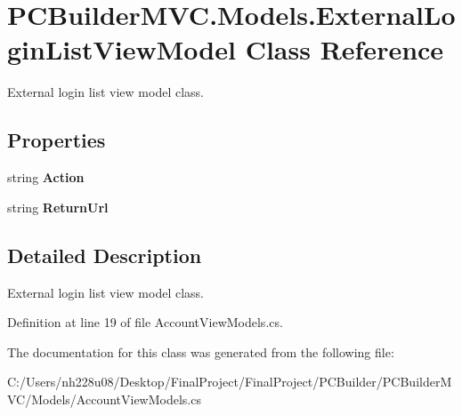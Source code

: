 \hypertarget{class_p_c_builder_m_v_c_1_1_models_1_1_external_login_list_view_model}{}\section{P\+C\+Builder\+M\+V\+C.\+Models.\+External\+Login\+List\+View\+Model Class Reference}
\label{class_p_c_builder_m_v_c_1_1_models_1_1_external_login_list_view_model}


External login list view model class.  


\subsection*{Properties}
\begin{DoxyCompactItemize}
\item 
string {\bfseries Action}\hypertarget{class_p_c_builder_m_v_c_1_1_models_1_1_external_login_list_view_model_a04ad600ba1d7a65605acf6303c2b5189}{}\label{class_p_c_builder_m_v_c_1_1_models_1_1_external_login_list_view_model_a04ad600ba1d7a65605acf6303c2b5189}

\item 
string {\bfseries Return\+Url}\hypertarget{class_p_c_builder_m_v_c_1_1_models_1_1_external_login_list_view_model_ac764151b2b62a55514ffa72879488568}{}\label{class_p_c_builder_m_v_c_1_1_models_1_1_external_login_list_view_model_ac764151b2b62a55514ffa72879488568}

\end{DoxyCompactItemize}


\subsection{Detailed Description}
External login list view model class. 



Definition at line 19 of file Account\+View\+Models.\+cs.



The documentation for this class was generated from the following file\+:\begin{DoxyCompactItemize}
\item 
C\+:/\+Users/nh228u08/\+Desktop/\+Final\+Project/\+Final\+Project/\+P\+C\+Builder/\+P\+C\+Builder\+M\+V\+C/\+Models/Account\+View\+Models.\+cs\end{DoxyCompactItemize}
